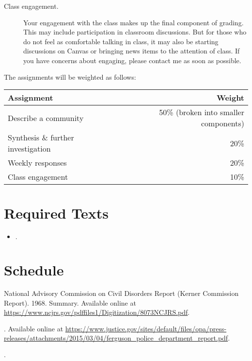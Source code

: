 \documentclass[11pt]{syllabus}
\begin{document}
\begin{description}
\item[Class engagement.] Your engagement with the class makes up the final component of grading. This may include participation in classroom discussions. But for those who do not feel as comfortable talking in class, it may also be starting discussions on Canvas or bringing news items to the attention of class. If you have concerns about engaging, please contact me as soon as possible.

\end{description}

\noindent The assignments will be weighted as follows:

\begin{center}
\begin{tabular}{lr}
\textbf{Assignment} & \textbf{Weight}\\\toprule
Describe a community & 50\% (broken into smaller components) \\
Synthesis \& further investigation & 20\%\\
Weekly responses & 20\%\\
Class engagement & 10\%\\\bottomrule
\end{tabular}
\end{center}

\showgrades


\section{Required Texts}
\begin{itemize}
    \item {}.
\end{itemize}

\section{Schedule}

\begin{readings}
\item National Advisory Commission on Civil Disorders Report (Kerner Commission Report). 1968. Summary. Available online at \url{https://www.ncjrs.gov/pdffiles1/Digitization/8073NCJRS.pdf}.
\item {}. Available online at \url{https://www.justice.gov/sites/default/files/opa/press-releases/attachments/2015/03/04/ferguson_police_department_report.pdf}.
\item {}.
\end{readings}
\end{document}
